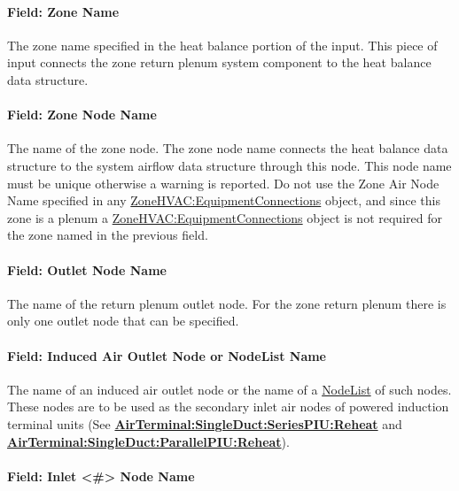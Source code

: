 \paragraph{Field: Zone Name}\label{field-zone-name-000}

The zone name specified in the heat balance portion of the input. This piece of input connects the zone return plenum system component to the heat balance data structure.

\paragraph{Field: Zone Node Name}\label{field-zone-node-name}

The name of the zone node. The zone node name connects the heat balance data structure to the system airflow data structure through this node. This node name must be unique otherwise a warning is reported. Do not use the Zone Air Node Name specified in any \hyperref[zonehvacequipmentconnections]{ZoneHVAC:EquipmentConnections} object, and since this zone is a plenum a \hyperref[zonehvacequipmentconnections]{ZoneHVAC:EquipmentConnections} object is not required for the zone named in the previous field.

\paragraph{Field: Outlet Node Name}\label{field-outlet-node-name-000}

The name of the return plenum outlet node. For the zone return plenum there is only one outlet node that can be specified.

\paragraph{Field: Induced Air Outlet Node or NodeList Name}\label{field-induced-air-outlet-node-or-nodelist-name}

The name of an induced air outlet node or the name of a \hyperref[nodelist]{NodeList} of such nodes. These nodes are to be used as the secondary inlet air nodes of powered induction terminal units (See \textbf{\hyperref[airterminalsingleductseriespiureheat]{AirTerminal:SingleDuct:SeriesPIU:Reheat}} and \textbf{\hyperref[airterminalsingleductparallelpiureheat]{AirTerminal:SingleDuct:ParallelPIU:Reheat}}).

\paragraph{Field: Inlet \textless{}\#\textgreater{} Node Name}\label{field-inlet-node-name}

